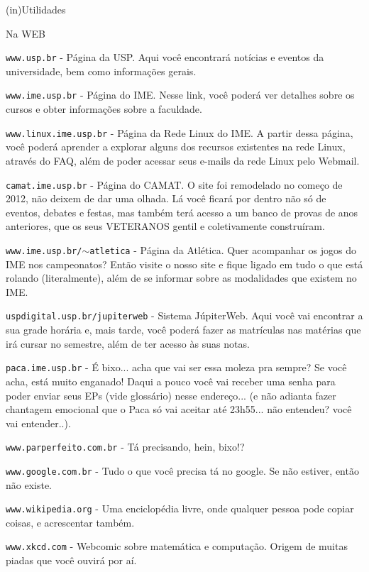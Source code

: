 \begin{secao}{(in)Utilidades}

\begin{subsecao}{Na WEB}

{\tt www.usp.br} - Página da USP. Aqui você encontrará notícias e eventos da
universidade, bem como informações gerais.

{\tt www.ime.usp.br} - Página do IME.
Nesse link, você poderá ver detalhes sobre os cursos e obter informações sobre
a faculdade.

{\tt www.linux.ime.usp.br} - Página da Rede Linux do IME. A partir dessa página,
você poderá aprender a explorar alguns dos recursos existentes na rede Linux,
através do FAQ, além de poder acessar seus e-mails da rede Linux pelo Webmail.

{\tt camat.ime.usp.br} - Página do CAMAT. O site foi remodelado no começo de
2012, não deixem de dar uma olhada. Lá você ficará por dentro não só de eventos,
debates e festas, mas também terá acesso a um banco de provas de anos anteriores,
que os seus VETERANOS gentil e coletivamente construíram.

{\tt www.ime.usp.br/$\sim$atletica} - Página da Atlética. Quer acompanhar os
jogos do IME nos campeonatos? Então visite o nosso site e fique ligado em tudo
o que está rolando (literalmente), além de se informar sobre as modalidades que
existem no IME.

{\tt uspdigital.usp.br/jupiterweb} - Sistema JúpiterWeb. Aqui você vai
encontrar a sua grade horária e, mais tarde, você poderá fazer as matrículas nas
matérias que irá cursar no semestre, além de ter acesso às suas notas.

{\tt paca.ime.usp.br} - É bixo... acha que vai ser essa moleza pra sempre? Se
você acha, está muito enganado! Daqui a pouco você vai receber uma senha para
poder enviar seus EPs (vide glossário) nesse endereço... (e não adianta fazer
chantagem emocional que o Paca só vai aceitar até 23h55... não entendeu? você
vai entender..).

{\tt www.parperfeito.com.br} - Tá precisando, hein, bixo!?

{\tt www.google.com.br} - Tudo o que você precisa tá no google. Se não estiver,
então não existe.

{\tt www.wikipedia.org} - Uma enciclopédia livre, onde qualquer pessoa pode
copiar coisas, e acrescentar também.

{\tt www.xkcd.com} - Webcomic sobre matemática e computação. Origem de muitas
piadas que você ouvirá por aí.


\end{subsecao}
\end{secao}
